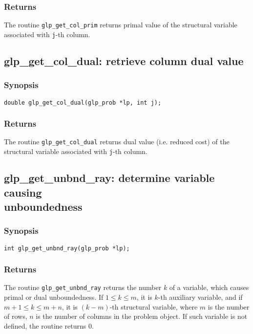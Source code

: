 \subsubsection*{Returns}

The routine \verb|glp_get_col_prim| returns primal value of the
structural variable associated with \verb|j|-th column.

\subsection{glp\_get\_col\_dual: retrieve column dual value}

\subsubsection*{Synopsis}

\begin{verbatim}
double glp_get_col_dual(glp_prob *lp, int j);
\end{verbatim}

\subsubsection*{Returns}

The routine \verb|glp_get_col_dual| returns dual value (i.e. reduced
cost) of the structural variable associated with \verb|j|-th column.

\newpage

\subsection{glp\_get\_unbnd\_ray: determine variable causing\\
unboundedness}

\subsubsection*{Synopsis}

\begin{verbatim}
int glp_get_unbnd_ray(glp_prob *lp);
\end{verbatim}

\subsubsection*{Returns}

The routine \verb|glp_get_unbnd_ray| returns the number $k$ of
a variable, which causes primal or dual unboundedness.
If $1\leq k\leq m$, it is $k$-th auxiliary variable, and if
$m+1\leq k\leq m+n$, it is $(k-m)$-th structural variable, where $m$ is
the number of rows, $n$ is the number of columns in the problem object.
If such variable is not defined, the routine returns 0.

